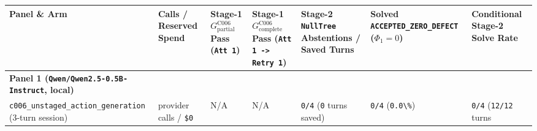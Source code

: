 \documentclass[
  11pt,
]{article}
\newcommand{\passthrough}[1]{#1}
\begin{document}
\begingroup\begin{landscape}\small
\begin{longtable}[]{@{}
  >{\raggedright\arraybackslash}p{}
  >{\raggedright\arraybackslash}p{}
  >{\raggedright\arraybackslash}p{}
  >{\raggedright\arraybackslash}p{}
  >{\raggedright\arraybackslash}p{}
  >{\raggedright\arraybackslash}p{}
  >{\raggedright\arraybackslash}p{}@{}}
\toprule\noalign{}
\begin{minipage}[b]{\linewidth}\raggedright
Panel \& Arm
\end{minipage} & \begin{minipage}[b]{\linewidth}\raggedright
Calls / Reserved Spend
\end{minipage} & \begin{minipage}[b]{\linewidth}\raggedright
Stage-1 \(G_{\text{partial}}^{\text{C006}}\) Pass
(\passthrough{\lstinline!Att 1!})
\end{minipage} & \begin{minipage}[b]{\linewidth}\raggedright
Stage-1 \(G_{\text{complete}}^{\text{C006}}\) Pass
(\passthrough{\lstinline!Att 1 -> Retry 1!})
\end{minipage} & \begin{minipage}[b]{\linewidth}\raggedright
Stage-2 \passthrough{\lstinline!NullTree!} Abstentions / Saved Turns
\end{minipage} & \begin{minipage}[b]{\linewidth}\raggedright
Solved \nolinkurl{ACCEPTED_ZERO_DEFECT} (\(\Phi_1 = 0\))
\end{minipage} & \begin{minipage}[b]{\linewidth}\raggedright
Conditional Stage-2 Solve Rate
\end{minipage} \\
\midrule\noalign{}
\endhead
\bottomrule\noalign{}
\endlastfoot
\textbf{Panel 1 (\nolinkurl{Qwen/Qwen2.5-0.5B-Instruct}, local)} & & & &
& & \\
\nolinkurl{c006_unstaged_action_generation} (3-turn session) & 0
provider calls / \passthrough{\lstinline!$0!} & N/A & N/A &
\passthrough{\lstinline!0/4!} (\passthrough{\lstinline!0!} turns saved)
& \passthrough{\lstinline!0/4!} (\passthrough{\lstinline!0.0\%!}) &
\passthrough{\lstinline!0/4!} (\passthrough{\lstinline!12/12!} turns

\end{longtable}
\end{landscape}
\end{document}
